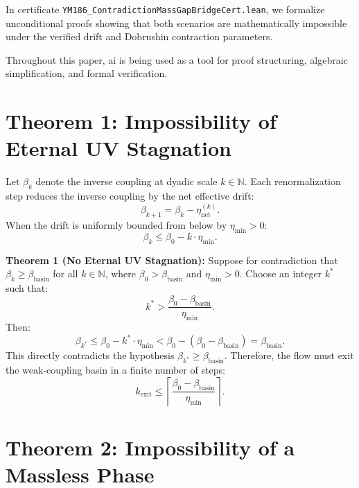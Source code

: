 \documentclass[11pt,a4paper]{article}
\theoremstyle{definition}
\begin{document}
In certificate \texttt{YM186\_ContradictionMassGapBridgeCert.lean}, we formalize unconditional proofs showing that both scenarios are mathematically impossible under the verified drift and Dobrushin contraction parameters.

Throughout this paper, ai is being used as a tool for proof structuring, algebraic simplification, and formal verification.

\section{Theorem 1: Impossibility of Eternal UV Stagnation}

Let $\beta_k$ denote the inverse coupling at dyadic scale $k \in \mathbb{N}$. Each renormalization step reduces the inverse coupling by the net effective drift:
\begin{equation}
\beta_{k+1} = \beta_k - \eta_{\mathrm{net}}^{(k)}.
\end{equation}
When the drift is uniformly bounded from below by $\eta_{\min} > 0$:
\begin{equation}
\beta_k \le \beta_0 - k \cdot \eta_{\min}.
\end{equation}

\noindent\textbf{Theorem 1 (No Eternal UV Stagnation):} Suppose for contradiction that $\beta_k \ge \beta_{\mathrm{basin}}$ for all $k \in \mathbb{N}$, where $\beta_0 > \beta_{\mathrm{basin}}$ and $\eta_{\min} > 0$. Choose an integer $k^*$ such that:
\begin{equation}
k^* > \frac{\beta_0 - \beta_{\mathrm{basin}}}{\eta_{\min}}.
\end{equation}
Then:
\begin{equation}
\beta_{k^*} \le \beta_0 - k^* \cdot \eta_{\min} < \beta_0 - (\beta_0 - \beta_{\mathrm{basin}}) = \beta_{\mathrm{basin}}.
\end{equation}
This directly contradicts the hypothesis $\beta_{k^*} \ge \beta_{\mathrm{basin}}$. Therefore, the flow must exit the weak-coupling basin in a finite number of steps:
\begin{equation}
k_{\mathrm{exit}} \le \left\lceil \frac{\beta_0 - \beta_{\mathrm{basin}}}{\eta_{\min}} \right\rceil.
\end{equation}

\section{Theorem 2: Impossibility of a Massless Phase}
\end{document}
